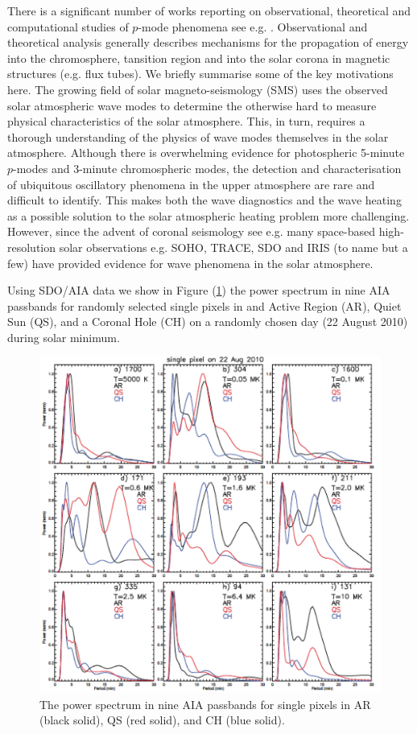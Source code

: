\documentclass[preprint,authoryear,12pt]{elsarticle}
\begin{document}
There is a significant number of works reporting on observational, theoretical and computational studies of $p$-mode phenomena see e.g. \citet{Christensen-Dalsgaard2002, Erdelyi2006A, Erdelyi2006B, Thompson2006, Pinter2011}. Observational and theoretical analysis generally describes mechanisms for the propagation of energy into the chromosphere, tansition region and into the solar corona in magnetic structures (e.g. flux tubes). We briefly summarise some of the key motivations here. The growing field of solar magneto-seismology (SMS) uses the observed solar atmospheric wave modes to determine the otherwise hard to measure physical characteristics of the solar atmosphere. This, in turn, requires a thorough understanding of the physics of wave modes themselves in the solar atmosphere. Although there is overwhelming evidence for photospheric 5-minute $p$-modes and 3-minute chromospheric modes, the detection and characterisation of ubiquitous oscillatory phenomena in the upper atmosphere are rare and difficult to identify. This makes both the wave diagnostics and the wave heating as a possible solution to the solar atmospheric heating problem more challenging. However, since the advent of coronal seismology see e.g. \citep{Roberts1984, Bannerjee2007, DeMoortel2005, Mathioudakis2013, Wang2011} many space-based high-resolution solar observations e.g. SOHO, TRACE, SDO and IRIS (to name but a few) have provided evidence for wave phenomena in the solar atmosphere.

Using SDO/AIA data we show  in Figure (\ref{powerspectrafig}) the power spectrum in nine AIA passbands for randomly selected single pixels in and Active Region (AR), Quiet Sun (QS), and a Coronal Hole (CH) on a randomly chosen day (22 August 2010) during solar minimum.

\begin{figure}[h]\label{powerspectrafig}
\includegraphics[scale=0.7]{imrescale/powerspectra.png}
\caption{The power spectrum in nine AIA passbands for single pixels in AR (black solid), QS (red solid), and CH (blue solid). }
\end{figure}
\end{document}
